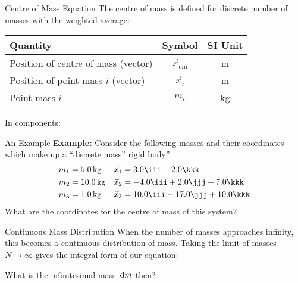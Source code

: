 \documentclass[12pt,compress,aspectratio=169]{beamer}
\begin{document}
\begin{frame}{Centre of Mass Equation}
  The centre of mass is defined for discrete number of masses with the weighted
  average:

  \begin{center}
    \begin{tabular}{l|c|c}
      \rowcolor{pink}
      \textbf{Quantity} & \textbf{Symbol} & \textbf{SI Unit} \\ \hline
      Position of centre of mass (vector) & $\vec x_\text{cm}$ & \si\metre \\
      Position of point mass $i$ (vector) & $\vec x_i$ & \si\metre \\
      Point mass $i$ & $m_i$ & \si{\kilo\gram}
    \end{tabular}
  \end{center}
  In components:

\end{frame}



\begin{frame}{An Example}
  \textbf{Example:} Consider the following masses and their coordinates
  which make up a ``discrete mass'' rigid body''
  \begin{align*}
    m_1&=\SI{5.0}{\kg} &\vec x_1&=3.0\iii-2.0\kkk\\
    m_2&=\SI{10.0}{\kg}&\vec x_2&=-4.0\iii+2.0\jjj+7.0\kkk\\
    m_3&=\SI{1.0}{\kg}&\vec x_3&=10.0\iii-17.0\jjj+10.0\kkk
  \end{align*}
  What are the coordinates for the centre of mass of this system?
\end{frame}



\begin{frame}{Continuous Mass Distribution}
  When the number of masses approaches infinity, this becomes a continuous
  distribution of mass. Taking the limit of masses $N\rightarrow\infty$ gives
  the integral form of our equation:


  What is the infinitesimal mass $\dl m$ then?
\end{frame}
\end{document}
